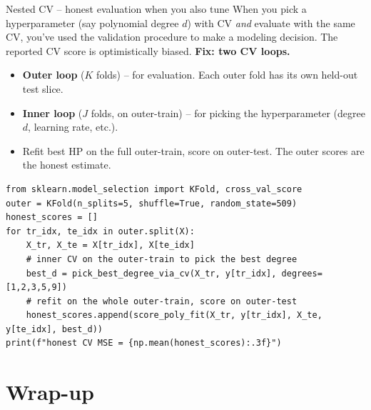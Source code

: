 \documentclass[aspectratio=169]{beamer}
\begin{document}
\begin{frame}[fragile]{Nested CV -- honest evaluation when you also tune}
  When you pick a hyperparameter (say polynomial degree $d$) with CV \emph{and} evaluate with the same CV, you've used the validation procedure to make a modeling decision. The reported CV score is optimistically biased.
  \vfill
  \textbf{Fix: two CV loops.}
  \begin{itemize}\small
    \item \textbf{Outer loop} ($K$ folds) -- for evaluation. Each outer fold has its own held-out test slice.
    \item \textbf{Inner loop} ($J$ folds, on outer-train) -- for picking the hyperparameter (degree $d$, learning rate, etc.).
    \item Refit best HP on the full outer-train, score on outer-test. The outer scores are the honest estimate.
  \end{itemize}
{\lstset{basicstyle=\ttfamily\scriptsize}
\begin{lstlisting}
from sklearn.model_selection import KFold, cross_val_score
outer = KFold(n_splits=5, shuffle=True, random_state=509)
honest_scores = []
for tr_idx, te_idx in outer.split(X):
    X_tr, X_te = X[tr_idx], X[te_idx]
    # inner CV on the outer-train to pick the best degree
    best_d = pick_best_degree_via_cv(X_tr, y[tr_idx], degrees=[1,2,3,5,9])
    # refit on the whole outer-train, score on outer-test
    honest_scores.append(score_poly_fit(X_tr, y[tr_idx], X_te, y[te_idx], best_d))
print(f"honest CV MSE = {np.mean(honest_scores):.3f}")
\end{lstlisting}}
  \vfill
\end{frame}

\section{Wrap-up}
\end{document}
